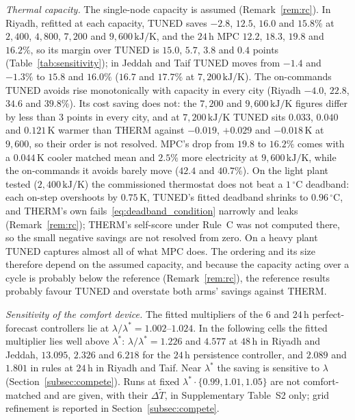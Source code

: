 \documentclass[pdflatex,sn-mathphys-num,iicol]{sn-jnl}
\theoremstyle{thmstyleone}\newtheorem{proposition}{Proposition}\newtheorem{corollary}{Corollary}
\theoremstyle{thmstyletwo}\newtheorem{remark}{Remark}\newtheorem{observation}{Observation}
\theoremstyle{thmstylethree}\newtheorem{definition}{Definition}
\begin{document}
\emph{Thermal capacity.} The single-node capacity is assumed (Remark~\ref{rem:rc}). In Riyadh, refitted at each capacity, TUNED saves $-2.8$, $12.5$, $16.0$ and $15.8\%$ at $2{,}400$, $4{,}800$, $7{,}200$ and $9{,}600\,\text{kJ/K}$, and the $24\,$h MPC $12.2$, $18.3$, $19.8$ and $16.2\%$, so its margin over TUNED is $15.0$, $5.7$, $3.8$ and $0.4$ points (Table~\ref{tab:sensitivity}); in Jeddah and Taif TUNED moves from $-1.4$ and $-1.3\%$ to $15.8$ and $16.0\%$ ($16.7$ and $17.7\%$ at $7{,}200\,\text{kJ/K}$). The on-commands TUNED avoids rise monotonically with capacity in every city (Riyadh $-4.0$, $22.8$, $34.6$ and $39.8\%$). Its cost saving does not: the $7{,}200$ and $9{,}600\,\text{kJ/K}$ figures differ by less than $3$ points in every city, and at $7{,}200\,\text{kJ/K}$ TUNED sits $0.033$, $0.040$ and $0.121\,$K warmer than THERM against $-0.019$, $+0.029$ and $-0.018\,$K at $9{,}600$, so their order is not resolved. MPC's drop from $19.8$ to $16.2\%$ comes with a $0.044\,$K cooler matched mean and $2.5\%$ more electricity at $9{,}600\,\text{kJ/K}$, while the on-commands it avoids barely move ($42.4$ and $40.7\%$). On the light plant tested ($2{,}400\,\text{kJ/K}$) the commissioned thermostat does not beat a $1\,^\circ$C deadband: each on-step overshoots by $0.75\,$K, TUNED's fitted deadband shrinks to $0.96\,^\circ$C, and THERM's own fails~\eqref{eq:deadband_condition} narrowly and leaks (Remark~\ref{rem:rc}); THERM's self-score under Rule~C was not computed there, so the small negative savings are not resolved from zero. On a heavy plant TUNED captures almost all of what MPC does. The ordering and its size therefore depend on the assumed capacity, and because the capacity acting over a cycle is probably below the reference (Remark~\ref{rem:rc}), the reference results probably favour TUNED and overstate both arms' savings against THERM.

\emph{Sensitivity of the comfort device.} The fitted multipliers of the $6$ and $24\,$h perfect-forecast controllers lie at $\lambda/\lambda^\ast=1.002$--$1.024$. In the following cells the fitted multiplier lies well above $\lambda^\ast$: $\lambda/\lambda^\ast=1.226$ and $4.577$ at $48\,$h in Riyadh and Jeddah, $13.095$, $2.326$ and $6.218$ for the $24\,$h persistence controller, and $2.089$ and $1.801$ in rules at $24\,$h in Riyadh and Taif. Near $\lambda^\ast$ the saving is sensitive to $\lambda$ (Section~\ref{subsec:compete}). Runs at fixed $\lambda^\ast\cdot\{0.99,1.01,1.05\}$ are not comfort-matched and are given, with their $\Delta\tilde T$, in Supplementary Table~S2 only; grid refinement is reported in Section~\ref{subsec:compete}.
\end{document}
